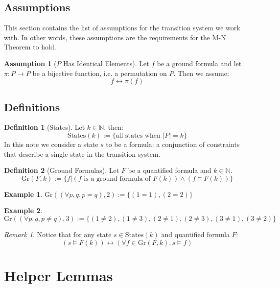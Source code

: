\documentclass[12pt]{article}
\theoremstyle{definition}
\newtheorem{assumption}{Assumption}
\newtheorem{definition}{Definition}
\newtheorem{example}{Example}
\theoremstyle{remark}
\newtheorem{remark}{Remark}
\newcommand{\states}{\text{States}}
\newcommand{\gr}{\text{Gr}}
\begin{document}
\subsection{Assumptions}
This section contains the list of assumptions for the transition system we work with.  In other words, these assumptions are the requirements for the M-N Theorem to hold.

\begin{assumption}[$P$ Has Identical Elements]
  \label{asmp:ident}
  Let $f$ be a ground formula and let $\pi : P \to P$ be a bijective function, i.e. a permutation on $P$.  Then we assume:
  $$f \leftrightarrow \pi(f)$$
\end{assumption}

\subsection{Definitions}
\begin{definition}[States]
  Let $k \in \mathbb{N}$, then:
  $$\states(k) := \{\text{all states when } |P|=k\}$$
  In this note we consider a state $s$ to be a formula: a conjunction of constraints that describe a single state in the transition system.
\end{definition}

\begin{definition}[Ground Formulas]
  Let $F$ be a quantified formula and $k \in \mathbb{N}$.
  $$\gr(F,k) := \{f | (f \text{ is a ground formula of } F(k)) \land (f \models F(k))\}$$
\end{definition}

\begin{example}
  $\gr((\forall p,q, p=q),2) := \{(1=1),(2=2)\}$
\end{example}
\begin{example}
  $\gr((\forall p,q, p \neq q),3) := \{(1 \neq 2),(1 \neq 3),(2 \neq 1),(2 \neq 3),(3 \neq 1),(3 \neq 2)\}$
\end{example}
\begin{remark}
  \label{rmk:pnf-ground}
  Notice that for any state $s \in \states(k)$ and quantified formula $F$:
  $$(s \models F(k)) \leftrightarrow (\forall f \in \gr(F,k), s \models f)$$
\end{remark}



\section{Helper Lemmas}
\end{document}
